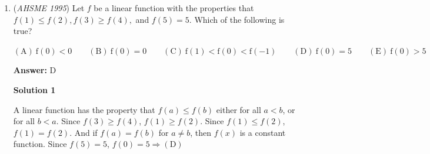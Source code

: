 \begin{enumerate}
 $\text{(i)}$ $4,000 \leq N < 6,000;$
$\text{(ii)}$ $N$ $\text{is a multiple of 5}$; 


 $\text{(iii)}$ $3 \leq b < c \leq 6$.


 

$\mathrm{(A) \ 10 } \qquad \mathrm{(B) \ 18 } \qquad \mathrm{(C) \ 24 } \qquad \mathrm{(D) \ 36 } \qquad \mathrm{(E) \ 48 }$

 \textbf{Answer: }C



\textbf{Solution}


            \begin{itemize}
        \item For condition (i), the restriction is put on $a$; $N<4000$ if $a<4$, and $N \ge 6$ if $a \ge 6$. Therefore, $a=4,5$.
        \item For condition (ii), the restriction is put on $d$; it must be a multiple of $5$. Therefore, $d=0,5$.
        \item For condition (iii), the restriction is put on $b$ and $c$. The possible ordered pairs of $b$ and $c$ are $(3,4)$, $(3,5)$, $(3,6)$, $(4,5), (4,6),$ and $(5,6),$ and there are $6$ of them. Alternatively, we are picking from the four digits 3, 4, 5, 6, and for every combination of two, there is exactly one way to arrange them in increasing order, so we have $\binom{4}{2} = 6$ choices for $b$ and $c$ when we consider them together.
            \end{itemize}
            Multiplying the possibilities for each restriction, $2 \cdot 2 \cdot 6=24\Rightarrow \mathrm{(C)}$.

 


	\item (\textit{AHSME 1995}) Let $f$ be a linear function with the properties that $f(1) \leq f(2), f(3) \geq f(4),$ and $f(5) = 5$. Which of the following is true?


 $\mathrm{(A) \ f(0) < 0 } \qquad \mathrm{(B) \ f(0) = 0 } \qquad \mathrm{(C) \ f(1) < f(0) < f( - 1) } \qquad \mathrm{(D) \ f(0) = 5 } \qquad \mathrm{(E) \ f(0) > 5 }$

 \textbf{Answer: }D



\textbf{Solution 1}

A linear function has the property that $f(a)\leq f(b)$ either for all $a<b$, or for all $b<a$. Since $f(3)\geq f(4)$, $f(1)\geq f(2)$. Since $f(1)\leq f(2)$, $f(1)=f(2)$. And if $f(a)=f(b)$ for $a\neq b$, then $f(x)$ is a constant function. Since $f(5)=5$, $f(0)=5\Rightarrow \mathrm{(D)}$





\end{enumerate}
